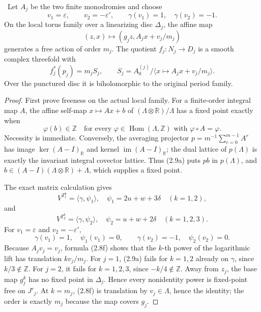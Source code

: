 \begin{proposition}
\label{prop:candidate-finite-fillings}
\Verified\ Let \(A_j\) be the two finite monodromies and choose
\[
 v_1=\varepsilon,\qquad v_2=-\varepsilon',
 \qquad \gamma(v_1)=1,\quad\gamma(v_2)=-1.
\]
On the local torus family over a linearizing disc \(\Delta_j\), the affine
map
\[
 (z,x)\longmapsto(g_jz,A_jx+v_j/m_j)
\tag{2.9}
\]
generates a free action of order \(m_j\).  The quotient
\(f_j:N_j\to D_j\) is a smooth complex threefold with
\[
 f_j^*(p_j)=m_jS_j,\qquad
 S_j=A_0^{(j)}/\langle x\mapsto A_jx+v_j/m_j\rangle.
\tag{2.10}
\]
Over the punctured disc it is biholomorphic to the original period family.
\end{proposition}

\begin{proof}
First prove freeness on the actual local family.  For a finite-order
integral map \(A\), the affine self-map \(x\mapsto Ax+b\) of
\((\Lambda\otimes\mathbb R)/\Lambda\) has a fixed point exactly when
\[
 \varphi(b)\in\mathbb Z
 \quad\text{for every }\varphi\in\operatorname{Hom}(\Lambda,\mathbb Z)
 \text{ with }\varphi\circ A=\varphi.
 \tag{2.9a}
\]
Necessity is immediate.  Conversely, the averaging projector
\(p=m^{-1}\sum_{r=0}^{m-1}A^r\) has image \(\ker(A-I)_{\mathbb R}\) and
kernel \(\operatorname{im}(A-I)_{\mathbb R}\); the dual lattice of
\(p(\Lambda)\) is exactly the invariant integral covector lattice.  Thus
(2.9a) puts \(pb\) in \(p(\Lambda)\), and
\(b\in(A-I)(\Lambda\otimes\mathbb R)+\Lambda\), which supplies a fixed
point.

The exact matrix calculation gives
\[
 V^{T_1^k}=\langle\gamma,\psi_1\rangle,
 \quad \psi_1=2u+w+3\delta \quad(k=1,2),
\]
and
\[
 V^{T_2^k}=\langle\gamma,\psi_2\rangle,
 \quad \psi_2=u+w+2\delta \quad(k=1,2,3).
 \tag{2.9b}
\]
For \(v_1=\varepsilon\) and \(v_2=-\varepsilon'\),
\[
 \gamma(v_1)=1,\quad\psi_1(v_1)=0,
 \qquad
 \gamma(v_2)=-1,\quad\psi_2(v_2)=0.
 \tag{2.9c}
\]
Because \(A_jv_j=v_j\), formula (2.8f) shows that the \(k\)-th power of
the logarithmic lift has translation \(kv_j/m_j\).  For \(j=1\), (2.9a)
fails for \(k=1,2\) already on \(\gamma\), since \(k/3\notin\mathbb Z\).
For \(j=2\), it fails for \(k=1,2,3\), since \(-k/4\notin\mathbb Z\).
Away from \(z_j\), the base map \(g_j^k\) has no fixed point in
\(\Delta_j\).  Hence every nonidentity power is fixed-point free on
\(J'_j\).  At \(k=m_j\), (2.8f) is translation by
\(v_j\in\Lambda\), hence the identity; the order is exactly \(m_j\)
because the map covers \(g_j\).


\end{proof}
